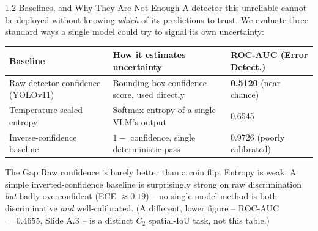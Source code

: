 \documentclass[aspectratio=169,11pt]{beamer}
\newcommand{\evidence}[1]{\textcolor{HildesheimRed}{\textbf{#1}}}
\begin{document}
\begin{frame}{1.2 Baselines, and Why They Are Not Enough}
\footnotesize
A detector this unreliable cannot be deployed without knowing \emph{which} of its predictions to trust. We evaluate three standard ways a single model could try to signal its own uncertainty:
\begin{table}[!htbp]
\centering
\begin{tabular}{p{2.8cm}p{5.0cm}p{3.0cm}}
\toprule
\textbf{Baseline} & \textbf{How it estimates uncertainty} & \textbf{ROC-AUC (Error Detect.)} \\
\midrule
Raw detector confidence (YOLOv11) & Bounding-box confidence score, used directly & \evidence{0.5120} (near chance) \\
Temperature-scaled entropy & Softmax entropy of a single VLM's output & 0.6545 \\
Inverse-confidence baseline & $1 -$ confidence, single deterministic pass & 0.9726 (poorly calibrated) \\
\bottomrule
\end{tabular}
\end{table}
\begin{alertblock}{The Gap}
Raw confidence is barely better than a coin flip. Entropy is weak. A simple inverted-confidence baseline is surprisingly strong on raw discrimination \emph{but} badly overconfident (ECE $\approx 0.19$) -- no single-model method is both discriminative \emph{and} well-calibrated. \tiny{(A different, lower figure -- ROC-AUC$=0.4655$, Slide A.3 -- is a distinct $C_2$ spatial-IoU task, not this table.)}
\end{alertblock}
\end{frame}
\end{document}
